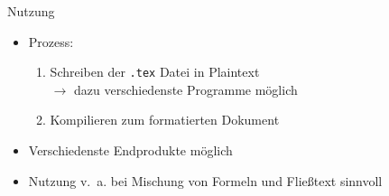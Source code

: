 
\begin{frame}{Nutzung}

	\begin{itemize}[<+-|alert@+>]
		\item Prozess:
		\begin{enumerate}
			\item Schreiben der \texttt{.tex} Datei in Plaintext
			\\$\rightarrow$ dazu verschiedenste Programme möglich

			\item Kompilieren zum formatierten Dokument
		\end{enumerate}

		\item Verschiedenste Endprodukte möglich
		\item Nutzung v.~a. bei Mischung von Formeln und Fließtext sinnvoll
	\end{itemize}

\end{frame}
